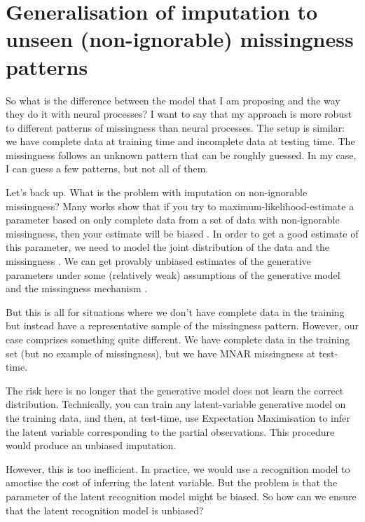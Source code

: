 \documentclass[a4paper,12pt,twoside,openright]{report}
\begin{document}
\section{Generalisation of imputation to unseen (non-ignorable) missingness patterns}

So what is the difference between the model that I am proposing and the way they do it with neural processes? I want to say that my approach is more robust to different patterns of missingness than neural processes. The setup is similar: we have complete data at training time and incomplete data at testing time. The missingness follows an unknown pattern that can be roughly guessed. In my case, I can guess a few patterns, but not all of them.

Let's back up. What is the problem with imputation on non-ignorable missingness? Many works show that if you try to maximum-likelihood-estimate a parameter based on only complete data from a set of data with non-ignorable missingness, then your estimate will be biased \parencite{rubinInferenceMissingData1976}. In order to get a good estimate of this parameter, we need to model the joint distribution of the data and the missingness \parencite{littleStatisticalAnalysisMissing2002}. We can get provably unbiased estimates of the generative parameters under some (relatively weak) assumptions of the generative model and the missingness mechanism \parencite{maIdentifiableGenerativeModels2021}.

But this is all for situations where we don't have complete data in the training but instead have a representative sample of the missingness pattern. However, our case comprises something quite different. We have complete data in the training set (but no example of missingness), but we have MNAR missingness at test-time.

The risk here is no longer that the generative model does not learn the correct distribution. Technically, you can train any latent-variable generative model on the training data, and then, at test-time, use Expectation Maximisation to infer the latent variable corresponding to the partial observations. This procedure would produce an unbiased imputation.

However, this is too inefficient. In practice, we would use a recognition model to amortise the cost of inferring the latent variable. But the problem is that the parameter of the latent recognition model might be biased. So how can we ensure that the latent recognition model is unbiased?
\end{document}
